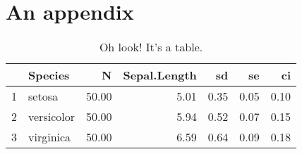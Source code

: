 \chapter{An appendix}

\lipsum[81]

\begin{table}[ht]
\centering
\begin{tabular}{rlrrrrr}
  \hline
 & Species & N & Sepal.Length & sd & se & ci \\ 
  \hline
1 & setosa & 50.00 & 5.01 & 0.35 & 0.05 & 0.10 \\ 
  2 & versicolor & 50.00 & 5.94 & 0.52 & 0.07 & 0.15 \\ 
  3 & virginica & 50.00 & 6.59 & 0.64 & 0.09 & 0.18 \\ 
   \hline
\end{tabular}
\caption{Oh look! It's a table.}
\end{table}